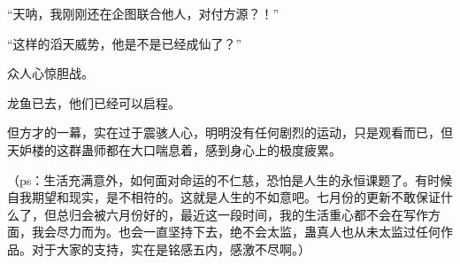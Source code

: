 \begin{this_body}
“天呐，我刚刚还在企图联合他人，对付方源？！”

“这样的滔天威势，他是不是已经成仙了？”

众人心惊胆战。

龙鱼已去，他们已经可以启程。

但方才的一幕，实在过于震骇人心，明明没有任何剧烈的运动，只是观看而已，但天妒楼的这群蛊师都在大口喘息着，感到身心上的极度疲累。

（ps：生活充满意外，如何面对命运的不仁慈，恐怕是人生的永恒课题了。有时候自我期望和现实，是不相符的。这就是人生的不如意吧。七月份的更新不敢保证什么了，但总归会被六月份好的，最近这一段时间，我的生活重心都不会在写作方面，我会尽力而为。也会一直坚持下去，绝不会太监，蛊真人也从未太监过任何作品。对于大家的支持，实在是铭感五内，感激不尽啊。）

\end{this_body}

